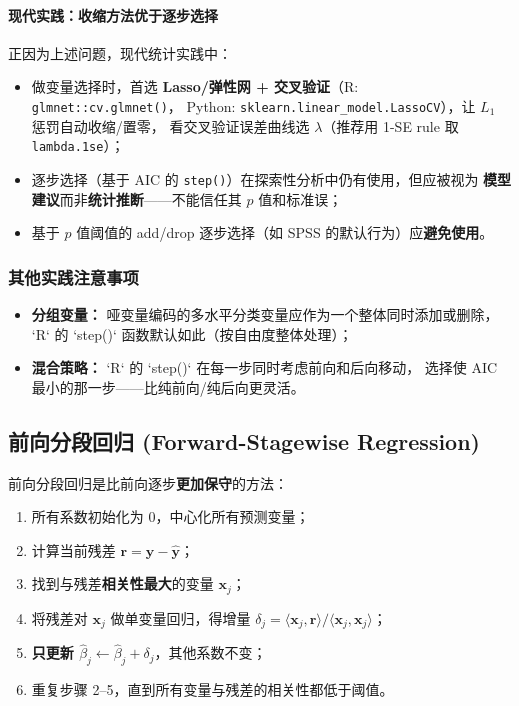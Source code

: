 \paragraph{现代实践：收缩方法优于逐步选择}

正因为上述问题，现代统计实践中：
\begin{itemize}
    \item 做变量选择时，首选 \textbf{Lasso/弹性网 + 交叉验证}（R: \texttt{glmnet::cv.glmnet()}，
    Python: \texttt{sklearn.linear\_model.LassoCV}），让 $L_1$ 惩罚自动收缩/置零，
    看交叉验证误差曲线选 $\lambda$（推荐用 1-SE rule 取 \texttt{lambda.1se}）；
    \item 逐步选择（基于 AIC 的 \texttt{step()}）在探索性分析中仍有使用，但应被视为
    \textbf{模型建议}而非\textbf{统计推断}——不能信任其 $p$ 值和标准误；
    \item 基于 $p$ 值阈值的 add/drop 逐步选择（如 SPSS 的默认行为）应\textbf{避免使用}。
\end{itemize}

\subsubsection{其他实践注意事项}

\begin{itemize}
    \item \textbf{分组变量：} 哑变量编码的多水平分类变量应作为一个整体同时添加或删除，
    `R` 的 `step()` 函数默认如此（按自由度整体处理）；
    \item \textbf{混合策略：} `R` 的 `step()` 在每一步同时考虑前向和后向移动，
    选择使 AIC 最小的那一步——比纯前向/纯后向更灵活。
\end{itemize}

\subsection{前向分段回归 (Forward-Stagewise Regression)}

前向分段回归是比前向逐步\textbf{更加保守}的方法：

\begin{enumerate}[label=第 \arabic* 步：, leftmargin=*]
    \item 所有系数初始化为 0，中心化所有预测变量；
    \item 计算当前残差 $\mathbf{r} = \mathbf{y} - \hat{\mathbf{y}}$；
    \item 找到与残差\textbf{相关性最大}的变量 $\mathbf{x}_j$；
    \item 将残差对 $\mathbf{x}_j$ 做单变量回归，得增量 $\delta_j = \langle \mathbf{x}_j, \mathbf{r} \rangle / \langle \mathbf{x}_j, \mathbf{x}_j \rangle$；
    \item \textbf{只更新 $\hat{\beta}_j \leftarrow \hat{\beta}_j + \delta_j$}，其他系数不变；
    \item 重复步骤 2--5，直到所有变量与残差的相关性都低于阈值。
\end{enumerate}

